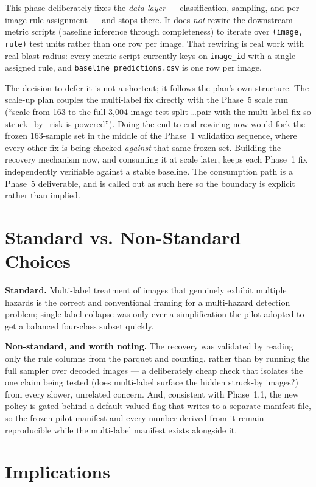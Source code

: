 This phase deliberately fixes the \emph{data layer} --- classification, sampling, and per-image rule
assignment --- and stops there. It does \emph{not} rewire the downstream metric scripts (baseline
inference through completeness) to iterate over \texttt{(image, rule)} test units rather than one row
per image. That rewiring is real work with real blast radius: every metric script currently keys on
\texttt{image\_id} with a single assigned rule, and \texttt{baseline\_predictions.csv} is one row per
image.

The decision to defer it is not a shortcut; it follows the plan's own structure. The scale-up plan
couples the multi-label fix directly with the Phase~5 scale run (``scale from 163 to the full
3{,}004-image test split \ldots pair with the multi-label fix so struck\_by\_risk is powered''). Doing
the end-to-end rewiring now would fork the frozen 163-sample set in the middle of the Phase~1
validation sequence, where every other fix is being checked \emph{against} that same frozen set.
Building the recovery mechanism now, and consuming it at scale later, keeps each Phase~1 fix
independently verifiable against a stable baseline. The consumption path is a Phase~5 deliverable, and
is called out as such here so the boundary is explicit rather than implied.

\section{Standard vs. Non-Standard Choices}

\textbf{Standard.} Multi-label treatment of images that genuinely exhibit multiple hazards is the
correct and conventional framing for a multi-hazard detection problem; single-label collapse was only
ever a simplification the pilot adopted to get a balanced four-class subset quickly.

\textbf{Non-standard, and worth noting.} The recovery was validated by reading only the rule columns
from the parquet and counting, rather than by running the full sampler over decoded images --- a
deliberately cheap check that isolates the one claim being tested (does multi-label surface the hidden
struck-by images?) from every slower, unrelated concern. And, consistent with Phase~1.1, the new
policy is gated behind a default-valued flag that writes to a separate manifest file, so the frozen
pilot manifest and every number derived from it remain reproducible while the multi-label manifest
exists alongside it.

\section{Implications}

